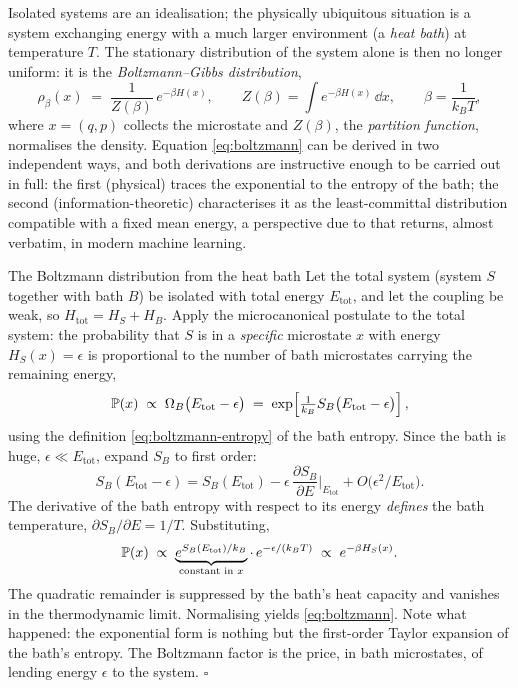 Isolated systems are an idealisation; the physically ubiquitous situation
is a system exchanging energy with a much larger environment (a
\emph{heat bath}) at temperature $T$. The stationary distribution of the
system alone is then no longer uniform: it is the
\emph{Boltzmann--Gibbs distribution},
\begin{equation}
  \boxed{\;
  \rho_\beta(x) \;=\; \frac{1}{Z(\beta)}\, e^{-\beta H(x)},
  \qquad
  Z(\beta) = \int e^{-\beta H(x)}\,\dd x,
  \qquad
  \beta = \frac{1}{k_B T},
  \;}
  \label{eq:boltzmann}
\end{equation}
where $x = (q,p)$ collects the microstate and $Z(\beta)$, the
\emph{partition function}, normalises the density. Equation
\eqref{eq:boltzmann} can be derived in two independent ways, and both
derivations are instructive enough to be carried out in full: the first
(physical) traces the exponential to the entropy of the bath; the second
(information-theoretic) characterises it as the least-committal
distribution compatible with a fixed mean energy, a perspective due to
\citet{jaynes1957information} that returns, almost verbatim, in modern
machine learning.

\begin{toolbox}{The Boltzmann distribution from the heat bath}
Let the total system (system $S$ together with bath $B$) be isolated with
total energy $E_{\mathrm{tot}}$, and let the coupling be weak, so
$H_{\mathrm{tot}} = H_S + H_B$. Apply the microcanonical postulate to the
total system: the probability that $S$ is in a \emph{specific} microstate
$x$ with energy $H_S(x) = \epsilon$ is proportional to the number of bath
microstates carrying the remaining energy,
\begin{equation*}
  \mathbb{P}(x) \;\propto\; \Omega_B\big(E_{\mathrm{tot}} - \epsilon\big)
  \;=\; \exp\!\left[ \tfrac{1}{k_B} S_B\big(E_{\mathrm{tot}} - \epsilon\big) \right],
\end{equation*}
using the definition \eqref{eq:boltzmann-entropy} of the bath entropy.
Since the bath is huge, $\epsilon \ll E_{\mathrm{tot}}$, expand $S_B$ to
first order:
\begin{equation*}
  S_B(E_{\mathrm{tot}} - \epsilon)
  = S_B(E_{\mathrm{tot}})
  - \epsilon \,\frac{\partial S_B}{\partial E}\Big|_{E_{\mathrm{tot}}}
  + O\!\big(\epsilon^2 / E_{\mathrm{tot}}\big).
\end{equation*}
The derivative of the bath entropy with respect to its energy
\emph{defines} the bath temperature,
$\partial S_B / \partial E = 1/T$. Substituting,
\begin{equation*}
  \mathbb{P}(x) \;\propto\;
  \underbrace{e^{S_B(E_{\mathrm{tot}})/k_B}}_{\text{constant in } x}
  \cdot\, e^{-\epsilon/(k_B T)}
  \;\propto\; e^{-\beta H_S(x)} .
\end{equation*}
The quadratic remainder is suppressed by the bath's heat capacity and
vanishes in the thermodynamic limit. Normalising yields
\eqref{eq:boltzmann}. Note what happened: the exponential form is nothing
but the first-order Taylor expansion of the bath's entropy. The Boltzmann
factor is the price, in bath microstates, of lending energy $\epsilon$ to
the system. \hfill$\square$
\end{toolbox}

